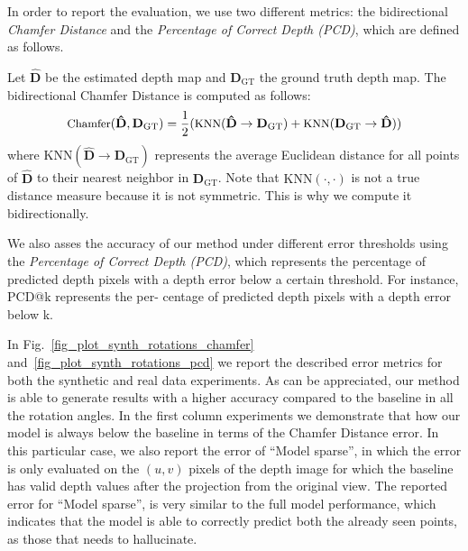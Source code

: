 \newcommand{\bgt}{\bD_{\textrm{GT}}}
\newcommand{\bdcoarse}{\bD_{\textrm{coarse}}}

In order to report the evaluation, we use two different metrics: the bidirectional \textit{Chamfer Distance} and the \textit{Percentage of Correct Depth (PCD)}, which are defined as follows. 

Let $\mathbf{\hat{D}}$ be the estimated depth map and $\mathbf{D}_{\textrm{GT}}$ the ground truth depth map. The bidirectional Chamfer Distance is computed as follows:
\begin{equation}
\begin{small}
\textrm{Chamfer}(\mathbf{\hat{D}}, \mathbf{D}_{\textrm{GT}})=\frac{1}{2}(\textrm{KNN}(\mathbf{\hat{D}} \rightarrow \mathbf{D}_{\textrm{GT}})+ \textrm{KNN}(\mathbf{D}_{\textrm{GT}} \rightarrow \mathbf{\hat{D}}))
\end{small}
\end{equation}
where $\textrm{KNN}(\mathbf{\hat{D}} \rightarrow \mathbf{D}_{\textrm{GT}})$ represents the average Euclidean distance for all points of $\mathbf{\hat{D}}$ to their nearest neighbor in $\mathbf{D}_{\textrm{GT}}$. Note that $\textrm{KNN}(\cdot ,\cdot)$ is not a true distance measure because it is not symmetric. This is why we compute it bidirectionally. 

We also asses the accuracy of our method under different error thresholds using the {\em Percentage of Correct Depth (PCD)}, which represents the percentage of predicted depth pixels with a depth error below a certain threshold. For instance, PCD@k represents the per- centage of predicted depth pixels with a depth error below k. 

In Fig.~\ref{fig_plot_synth_rotations_chamfer} and~\ref{fig_plot_synth_rotations_pcd} we report the described error metrics for both the synthetic and real data experiments. As can be appreciated, our method is able to generate results with a higher accuracy compared to the baseline in all the rotation angles. In the first column experiments we demonstrate that how our model is always below the baseline in terms of the Chamfer Distance error. In this particular case, we also report the error of ``Model sparse'', in which the error is only evaluated on the $(u,v)$ pixels of the depth image for which the baseline has valid depth values after the projection from the original view. The  reported error for ``Model sparse'', is very similar to the full model performance, which indicates that the model is able to correctly predict both the already seen points, as those that needs to hallucinate. 

